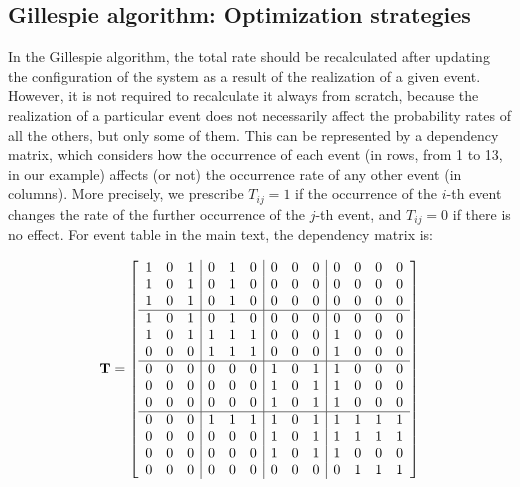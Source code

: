 \subsection{Gillespie algorithm: Optimization strategies}
\label{App:Optimization}
In the Gillespie algorithm, the total rate should be recalculated after updating the configuration of the system as a result of the realization of a given event. However, it is not required to recalculate it always from scratch, because the realization of a particular event does not necessarily affect the probability rates of all the others, but only some of them. This can be represented by a dependency matrix, which considers how the occurrence of each event (in rows, from 1 to 13, in our example) affects (or not) the occurrence rate of any other event (in columns). More precisely, we prescribe $T_{ij} = 1$ if the occurrence of the $i$-th event changes the rate of the further occurrence of the $j$-th event, and $T_{ij} = 0$ if there is no effect. For event table in the main text, the dependency matrix is:  

\begin{equation}
{\bf T} = 
\left[ \begin{array}{ccc|ccc|ccc|cccc}
1 & 0 & 1  & 0 & 1 & 0  & 0 & 0 & 0  & 0 & 0 & 0 & 0 \\
1 & 0 & 1  & 0 & 1 & 0  & 0 & 0 & 0  & 0 & 0 & 0 & 0 \\
1 & 0 & 1  & 0 & 1 & 0  & 0 & 0 & 0  & 0 & 0 & 0 & 0 \\
\hline
1 & 0 & 1  & 0 & 1 & 0  & 0 & 0 & 0  & 0 & 0 & 0 & 0 \\
1 & 0 & 1  & 1 & 1 & 1  & 0 & 0 & 0  & 1 & 0 & 0 & 0 \\
0 & 0 & 0  & 1 & 1 & 1  & 0 & 0 & 0  & 1 & 0 & 0 & 0 \\
\hline
0 & 0 & 0  & 0 & 0 & 0  & 1 & 0 & 1  & 1 & 0 & 0 & 0 \\
0 & 0 & 0  & 0 & 0 & 0  & 1 & 0 & 1  & 1 & 0 & 0 & 0 \\
0 & 0 & 0  & 0 & 0 & 0  & 1 & 0 & 1  & 1 & 0 & 0 & 0 \\
\hline
0 & 0 & 0  & 1 & 1 & 1  & 1 & 0 & 1  & 1 & 1 & 1 & 1 \\
0 & 0 & 0  & 0 & 0 & 0  & 1 & 0 & 1  & 1 & 1 & 1 & 1 \\
0 & 0 & 0  & 0 & 0 & 0  & 1 & 0 & 1  & 1 & 0 & 0 & 0 \\
0 & 0 & 0  & 0 & 0 & 0  & 0 & 0 & 0  & 0 & 1 & 1 & 1 \\
\end{array}
\right]
\label{T_E}
\end{equation}

